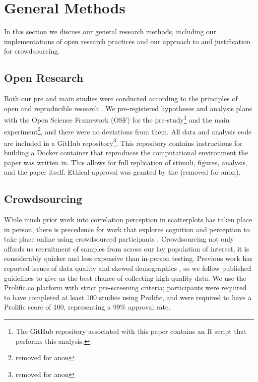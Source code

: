 \documentclass[manuscript,screen,review]{acmart}
\begin{document}
\section{General Methods}\label{sec-general-methods}

In this section we discuss our general research methods, including our
implementations of open research practices and our approach to and
justification for crowdsourcing.

\subsection{Open Research}\label{sec-open-research}

Both our pre and main studies were conducted according to the principles
of open and reproducible research \citep{ayris_2018}. We pre-registered
hypotheses and analysis plans with the Open Science Framework (OSF) for
the pre-study\footnote{The GitHub repository associated with this paper
  contains an R script that performs this analysis.} and the main
experiment\footnote{removed for anon}, and there were no deviations from
them. All data and analysis code are included in a GitHub
repository\footnote{removed for anon}. This repository contains
instructions for building a Docker container \citep{merkel_2014} that
reproduces the computational environment the paper was written in. This
allows for full replication of stimuli, figures, analysis, and the paper
itself. Ethical approval was granted by the (removed for anon).

\subsection{Crowdsourcing}\label{sec-crowdsourcing}

While much prior work into correlation perception in scatterplots has
taken place in person, there is precedence for work that explores
cognition and perception to take place online using crowdsourced
participants \citep{xiong_2022}. Crowdsourcing not only affords us
recruitment of samples from across our lay population of interest, it is
considerably quicker and less expensive than in-person testing. Previous
work has reported issues of data quality and skewed demographics
\citep{chmielewski_2020, charalambides_2021, peer_2021}, so we follow
published guidelines \citep{peer_2021} to give us the best chance of
collecting high quality data. We use the Prolific.co platform
\citep{prolific} with strict pre-screening criteria; participants were
required to have completed at least 100 studies using Prolific, and were
required to have a Prolific score of 100, representing a 99\% approval
rate.
\end{document}
